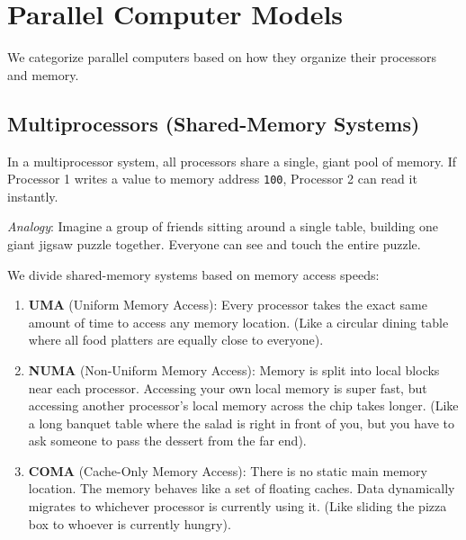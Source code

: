 \documentclass[11pt,a4paper]{article}
\begin{document}
\section{Parallel Computer Models}

We categorize parallel computers based on how they organize their processors and memory.

\subsection{Multiprocessors (Shared-Memory Systems)}
In a multiprocessor system, all processors share a single, giant pool of memory. If Processor 1 writes a value to memory address \texttt{100}, Processor 2 can read it instantly. 

\textit{Analogy}: Imagine a group of friends sitting around a single table, building one giant jigsaw puzzle together. Everyone can see and touch the entire puzzle.

\begin{center}
\end{center}

We divide shared-memory systems based on memory access speeds:
\begin{enumerate}
    \item \textbf{UMA} (Uniform Memory Access): Every processor takes the exact same amount of time to access any memory location. (Like a circular dining table where all food platters are equally close to everyone).
    \item \textbf{NUMA} (Non-Uniform Memory Access): Memory is split into local blocks near each processor. Accessing your own local memory is super fast, but accessing another processor's local memory across the chip takes longer. (Like a long banquet table where the salad is right in front of you, but you have to ask someone to pass the dessert from the far end).
    \item \textbf{COMA} (Cache-Only Memory Access): There is no static main memory location. The memory behaves like a set of floating caches. Data dynamically migrates to whichever processor is currently using it. (Like sliding the pizza box to whoever is currently hungry).
\end{enumerate}
\end{document}
